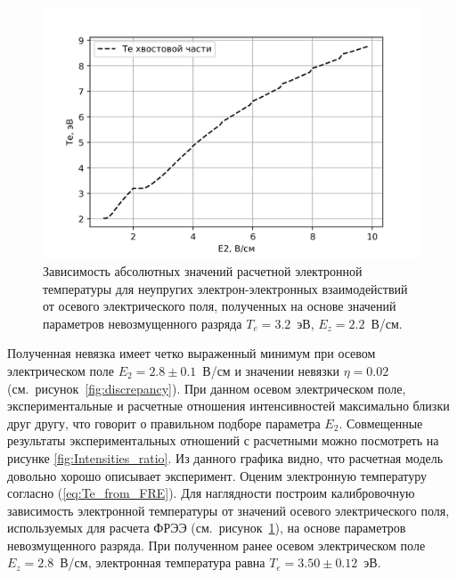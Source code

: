 \begin{figure}[t]
  \centering
  \includegraphics[width=16cm]{figures/Te_tail}
  \caption{Зависимость абсолютных значений расчетной электронной температуры для неупругих электрон-электронных
  взаимодействий от осевого электрического поля, полученных на основе значений параметров невозмущенного разряда $T_e = 3.2$~эВ, $E_z = 2.2$~В/см.}
  \label{fig:Te_tail}
\end{figure}

Полученная невязка имеет четко выраженный минимум при осевом электрическом
поле $E_2 = 2.8 \pm 0.1$~В/см и значении невязки $\eta = 0.02$ (см.~рисунок~\ref{fig:discrepancy}).
При данном осевом электрическом поле, экспериментальные и расчетные отношения интенсивностей максимально близки друг другу,
что говорит о правильном подборе параметра $E_2$.
Совмещенные результаты экспериментальных отношений с расчетными можно посмотреть на рисунке \ref{fig:Intensities_ratio}.
Из данного графика видно, что расчетная модель довольно хорошо описывает эксперимент. Оценим электронную температуру
согласно (\ref{eq:Te_from_FRE}). Для наглядности построим калибровочную зависимость электронной температуры от
значений осевого электрического поля, используемых для расчета ФРЭЭ (см.~рисунок~\ref{fig:Te_tail}), на основе
параметров невозмущенного разряда. При полученном ранее осевом электрическом поле $E_z = 2.8$~В/см, электронная температура
равна $T_e = 3.50 \pm 0.12$~эВ.

